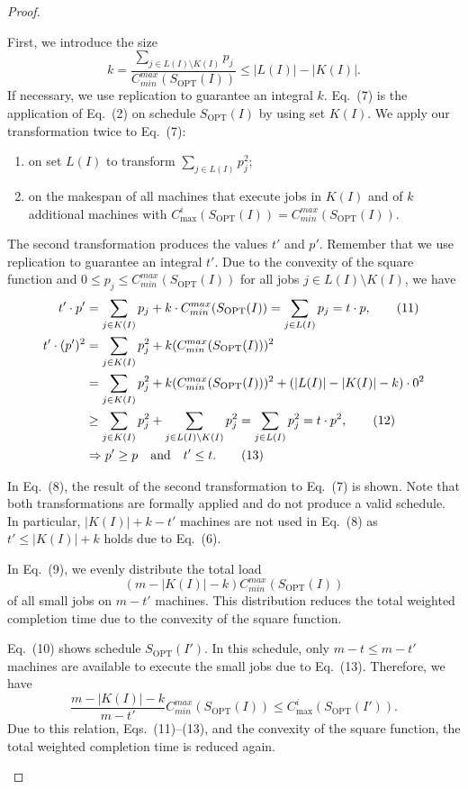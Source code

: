 \documentclass[11pt]{article}
\newcommand{\OPT}{\mathrm{OPT}}
\newcommand{\Cminmax}{C_{min}^{max}}
\begin{document}
\begin{proof}
\begin{enumerate}[label=(\arabic*)]
First, we introduce the size
\[
        k=
        \frac{\sum_{j\in L(I)\setminus K(I)}p_j}
        {\Cminmax(S_{\OPT}(I))}
        \leq
        |L(I)|-|K(I)|.
\]
If necessary, we use replication to guarantee an integral $k$. Eq.~(7) is
the application of Eq.~(2) on schedule $S_{\OPT}(I)$ by using set $K(I)$.
We apply our transformation twice to Eq.~(7):
\begin{enumerate}[label=(\alph*)]
\item on set $L(I)$ to transform $\sum_{j\in L(I)}p_j^2$;
\item on the makespan of all machines that execute jobs in $K(I)$ and of
$k$ additional machines with
$C_{\max}^i(S_{\OPT}(I))=\Cminmax(S_{\OPT}(I))$.
\end{enumerate}
The second transformation produces the values $t'$ and $p'$. Remember that
we use replication to guarantee an integral $t'$. Due to the convexity of the
square function and $0\leq p_j\leq \Cminmax(S_{\OPT}(I))$ for all jobs
$j\in L(I)\setminus K(I)$, we have
\begin{align}
        t'\cdot p'
        &=
        \sum_{j\in K(I)}p_j+k\cdot\Cminmax(S_{\OPT}(I))
        =
        \sum_{j\in L(I)}p_j
        =
        t\cdot p,                                                \tag{11}\\
        t'\cdot(p')^2
        &=
        \sum_{j\in K(I)}p_j^2+k(\Cminmax(S_{\OPT}(I)))^2          \notag\\
        &=
        \sum_{j\in K(I)}p_j^2+k(\Cminmax(S_{\OPT}(I)))^2
        +(|L(I)|-|K(I)|-k)\cdot 0^2                              \notag\\
        &\geq
        \sum_{j\in K(I)}p_j^2
        +
        \sum_{j\in L(I)\setminus K(I)}p_j^2
        =
        \sum_{j\in L(I)}p_j^2
        =
        t\cdot p^2,                                              \tag{12}\\
        &\Rightarrow
        p'\geq p
        \quad\text{and}\quad
        t'\leq t.                                                \tag{13}
\end{align}

In Eq.~(8), the result of the second transformation to Eq.~(7) is shown.
Note that both transformations are formally applied and do not produce a
valid schedule. In particular, $|K(I)|+k-t'$ machines are not used in
Eq.~(8) as $t'\leq |K(I)|+k$ holds due to Eq.~(6).

In Eq.~(9), we evenly distribute the total load
\[
        (m-|K(I)|-k)\Cminmax(S_{\OPT}(I))
\]
of all small jobs on $m-t'$ machines. This distribution reduces the total
weighted completion time due to the convexity of the square function.

Eq.~(10) shows schedule $S_{\OPT}(I')$. In this schedule, only
$m-t\leq m-t'$ machines are available to execute the small jobs due to
Eq.~(13). Therefore, we have
\[
        \frac{m-|K(I)|-k}{m-t'}\Cminmax(S_{\OPT}(I))
        \leq
        C_{\max}^i(S_{\OPT}(I')).
\]
Due to this relation, Eqs.~(11)--(13), and the convexity of the square
function, the total weighted completion time is reduced again.
\end{enumerate}
\end{proof}
\end{document}

